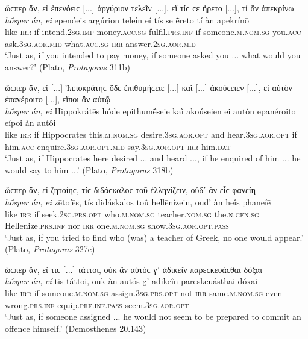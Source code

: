 \begin{exe}
\ex ὥϲπερ ἄν, εἰ ἐπενόειϲ {[}...{]} ἀργύριον τελεῖν {[}...{]}, εἴ τίϲ ϲε ἤρετο {[}...{]}, τί ἂν ἀπεκρίνω\\
\gll \emph{hṓsper} \emph{án}, \emph{ei} epenóeis argúrion teleîn eí tís se ḗreto tí àn apekrínō\\
like \textsc{irr} if intend.\textsc{2sg.imp} money.\textsc{acc.sg} fulfil.\textsc{prs.inf} if someone.\textsc{m.nom.sg} you.\textsc{acc} ask.\textsc{3sg.aor.mid} what.\textsc{acc.sg} \textsc{irr} answer.\textsc{2sg.aor.mid}\\
\trans `Just as, if you intended to pay money, if someone asked you ... what would you answer?' (Plato, \textit{Protagoras} 311b)
\label{osperanei5}
\end{exe}

\begin{exe}
\ex ὥϲπερ ἄν, εἰ {[}...{]} Ἱπποκράτηϲ ὅδε ἐπιθυμήϲειε {[}...{]} καὶ {[}...{]} ἀκούϲειεν {[}...{]}, εἰ αὐτὸν ἐπανέροιτο {[}...{]}, εἴποι ἂν αὐτῷ\\
\gll \emph{hṓsper} \emph{án}, \emph{ei} Hippokrátēs hóde epithumḗseie kaì akoúseien ei autòn epanéroito eípoi àn autôi\\
like \textsc{irr} if Hippocrates this.\textsc{m.nom.sg} desire.\textsc{3sg.aor.opt} and hear.\textsc{3sg.aor.opt} if him.\textsc{acc} enquire.\textsc{3sg.aor.opt.mid} say.\textsc{3sg.aor.opt} \textsc{irr} him.\textsc{dat}\\
\trans `Just as, if Hippocrates here desired ... and heard ..., if he enquired of him ... he would say to him ...' (Plato, \textit{Protagoras} 318b)
\label{osperanei6}
\end{exe}

\begin{exe}
\ex ὥϲπερ ἄν, εἰ ζητοίηϲ, τίϲ διδάϲκαλοϲ τοῦ ἑλληνίζειν, οὐδ᾽ ἂν εἷϲ φανείη\\
\gll \emph{hṓsper} \emph{án}, \emph{ei} zētoíēs, tís didáskalos toû hellēnízein, oud' àn heîs phaneíē\\
like \textsc{irr} if seek.\textsc{2sg.prs.opt} who.\textsc{m.nom.sg}
teacher.\textsc{nom.sg} the.\textsc{n.gen.sg} Hellenize.\textsc{prs.inf} nor \textsc{irr} one.\textsc{m.nom.sg} show.\textsc{3sg.aor.opt.pass}\\
\trans `Just as, if you tried to find who (was) a teacher of Greek, no one would appear.' (Plato, \textit{Protagoras} 327e)
\label{osperanei7}
\end{exe}

\begin{exe}
\ex ὥϲπερ ἄν, εἴ τιϲ {[}...{]} τάττοι, οὐκ ἂν αὐτόϲ γ᾽ ἀδικεῖν παρεϲκευάϲθαι δόξαι\\
\gll \emph{hṓsper} \emph{án}, \emph{eí} tis táttoi, ouk àn autós g' adikeîn pareskeuásthai dóxai\\
like \textsc{irr} if someone.\textsc{m.nom.sg} assign.\textsc{3sg.prs.opt} not \textsc{irr} same.\textsc{m.nom.sg} even wrong.\textsc{prs.inf} equip.\textsc{prf.inf.pass} seem.\textsc{3sg.aor.opt}\\
\trans `Just as, if someone assigned ... he would not seem to be prepared to commit an offence himself.' (Demosthenes 20.143)
\label{osperanei8}
\end{exe}

